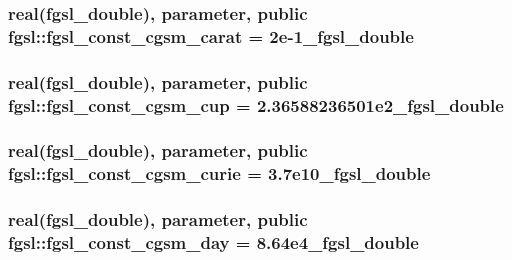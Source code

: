 \hypertarget{classfgsl_a239136f12feacdcaf3bc528ccb0c492f}{
\subsubsection[{fgsl\-\_\-const\-\_\-cgsm\-\_\-carat}]{\setlength{\rightskip}{0pt plus 5cm}real({\bf fgsl\-\_\-double}), parameter, public fgsl\-::fgsl\-\_\-const\-\_\-cgsm\-\_\-carat = 2e-\/1\-\_\-fgsl\-\_\-double}}\label{classfgsl_a239136f12feacdcaf3bc528ccb0c492f}
\hypertarget{classfgsl_aa3f891d5605128364396d3ae108b3d43}{
\subsubsection[{fgsl\-\_\-const\-\_\-cgsm\-\_\-cup}]{\setlength{\rightskip}{0pt plus 5cm}real({\bf fgsl\-\_\-double}), parameter, public fgsl\-::fgsl\-\_\-const\-\_\-cgsm\-\_\-cup = 2.\-36588236501e2\-\_\-fgsl\-\_\-double}}\label{classfgsl_aa3f891d5605128364396d3ae108b3d43}
\hypertarget{classfgsl_a1a2ad0a32e7001630dc57fb05a13896b}{
\subsubsection[{fgsl\-\_\-const\-\_\-cgsm\-\_\-curie}]{\setlength{\rightskip}{0pt plus 5cm}real({\bf fgsl\-\_\-double}), parameter, public fgsl\-::fgsl\-\_\-const\-\_\-cgsm\-\_\-curie = 3.\-7e10\-\_\-fgsl\-\_\-double}}\label{classfgsl_a1a2ad0a32e7001630dc57fb05a13896b}
\hypertarget{classfgsl_af34712504add6a207ec8e068ff61d8cd}{
\subsubsection[{fgsl\-\_\-const\-\_\-cgsm\-\_\-day}]{\setlength{\rightskip}{0pt plus 5cm}real({\bf fgsl\-\_\-double}), parameter, public fgsl\-::fgsl\-\_\-const\-\_\-cgsm\-\_\-day = 8.\-64e4\-\_\-fgsl\-\_\-double}}\label{classfgsl_af34712504add6a207ec8e068ff61d8cd}
